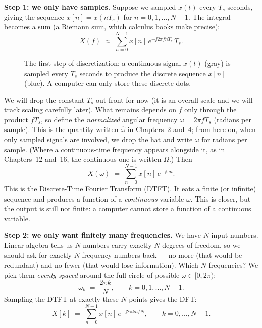 \textbf{Step 1: we only have samples.} Suppose we sampled $x(t)$ every $T_s$
seconds, giving the sequence $x[n] = x(nT_s)$ for $n = 0, 1, \dots, N-1$. The
integral becomes a sum (a Riemann sum, which calculus books
make precise):
\[
X(f) \;\approx\; \sum_{n=0}^{N-1} x[n]\, e^{-\jj 2\pi f n T_s}\, T_s .
\]

\begin{figure}[htbp]
\centering
{}
\caption{The first step of discretization: a continuous signal $x(t)$ (gray) is sampled every $T_s$ seconds to produce the discrete sequence $x[n]$ (blue). A computer can only store these discrete dots.}
\label{ch08:fig-sampling}
\end{figure}

We will drop the constant $T_s$ out front for now (it is an overall scale
and we will track scaling carefully later). What remains depends on $f$ only
through the product $f T_s$, so define the \emph{normalized} angular frequency
$\omega = 2\pi f T_s$ (radians per sample). This is the quantity written
$\hat\omega$ in Chapters~2 and~4; from here on, when only sampled signals are
involved, we drop the hat and write $\omega$ for radians per sample. (Where a
continuous-time frequency appears alongside it, as in Chapters~12 and~16, the
continuous one is written $\Omega$.) Then
\[
X(\omega) \;=\; \sum_{n=0}^{N-1} x[n]\, e^{-\jj \omega n}.
\]
This is the Discrete-Time Fourier Transform (DTFT). It eats a finite (or
infinite) sequence and produces a function of a \emph{continuous} variable
$\omega$. This is closer, but the output is still not finite: a computer cannot store a
function of a continuous variable.

\textbf{Step 2: we only want finitely many frequencies.}
We have $N$ input numbers. Linear algebra tells us $N$ numbers carry exactly $N$
degrees of freedom, so we should ask for exactly $N$ frequency numbers back ---
no more (that would be redundant) and no fewer (that would lose information).
Which $N$ frequencies? We pick them \emph{evenly spaced} around the full circle of
possible $\omega \in [0, 2\pi)$:
\[
\omega_k \;=\; \frac{2\pi k}{N}, \qquad k = 0, 1, \dots, N-1.
\]
Sampling the DTFT at exactly these $N$ points gives the DFT:
\[
\boxed{\;X[k] \;=\; \sum_{n=0}^{N-1} x[n]\, e^{-\jj 2\pi k n / N}, \qquad k = 0,\dots,N-1.\;}
\]

